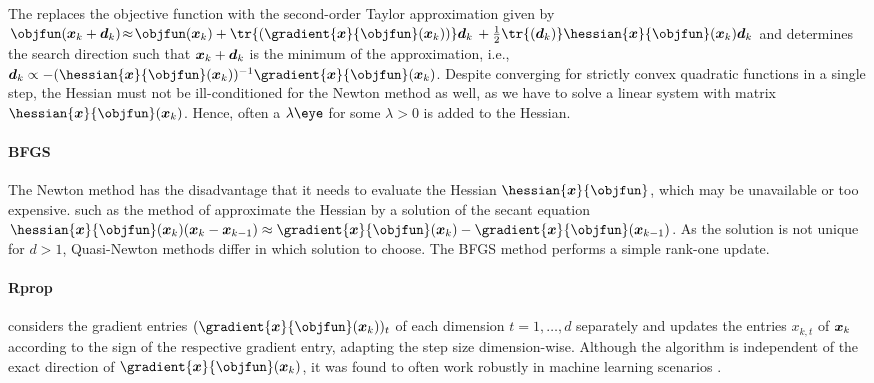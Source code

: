 The 
replaces the objective function with the second-order Taylor approximation
given by
$\objfun(\*x_k + \*d_k)
\!\approx\! \objfun(\*x_k) +
\tr{(\gradient{\*x}{\objfun}(\*x_k))} \*d_k \,+
\frac{1}{2} \tr{(\*d_k)} \hessian{\*x}{\objfun}(\*x_k) \*d_k$
and determines the search direction such that ${\boldsymbol{x}}_k + {\boldsymbol{d}}_k$ is
the minimum of the approximation, i.e.,
$\*d_k \propto
-(\hessian{\*x}{\objfun}(\*x_k))^{-1} \gradient{\*x}{\objfun}(\*x_k)$.
Despite converging for strictly convex quadratic functions in a single step,
the Hessian must not be ill-conditioned for the Newton method as well,
as we have to solve a linear system with matrix
$\hessian{\*x}{\objfun}(\*x_k)$.
Hence, often a  $\lambda \eye$
for some $\lambda > 0$ is added to the Hessian.

\paragraph{BFGS}

The Newton method has the disadvantage that it needs to evaluate the
Hessian $\hessian{\*x}{\objfun}$,
which may be unavailable or too expensive.
 such as the method of
approximate the Hessian by a solution of the secant equation
$\hessian{\*x}{\objfun}(\*x_k) (\*x_k - \*x_{k-1}) \approx
\gradient{\*x}{\objfun}(\*x_k) - \gradient{\*x}{\objfun}(\*x_{k-1})$.
As the solution is not unique for $d > 1$,
Quasi-Newton methods differ in which solution to choose.
The BFGS method performs a simple rank-one update.

\paragraph{Rprop}

considers the gradient entries $(\gradient{\*x}{\objfun}(\*x_k))_t$
of each dimension $t = 1, \dotsc, d$ separately
and updates the entries $x_{k,t}$ of ${\boldsymbol{x}}_k$
according to the sign of the respective gradient entry,
adapting the step size dimension-wise.
Although the algorithm is independent of the exact direction
of $\gradient{\*x}{\objfun}(\*x_k)$,
it was found to often work robustly in machine learning scenarios
\cite{Toussaint15Introduction}.

